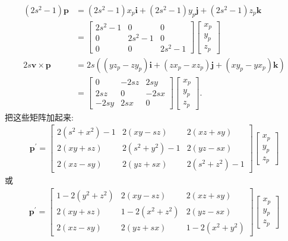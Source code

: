 $$
\begin{aligned}
\left(2 s^{2}-1\right) \mathbf{p} & =\left(2 s^{2}-1\right) x_{p} \mathbf{i}+\left(2 s^{2}-1\right) y_{p} \mathbf{j}+\left(2 s^{2}-1\right) z_{p} \mathbf{k} \\
& =\left[\begin{array}{ccc}
2 s^{2}-1 & 0 & 0 \\
0 & 2 s^{2}-1 & 0 \\
0 & 0 & 2 s^{2}-1
\end{array}\right]\left[\begin{array}{l}
x_{p} \\
y_{p} \\
z_{p}
\end{array}\right]\\
2 s \mathbf{v} \times \mathbf{p} & =2 s\left(\left(y z_{p}-z y_{p}\right) \mathbf{i}+\left(z x_{p}-x z_{p}\right) \mathbf{j}+\left(x y_{p}-y x_{p}\right) \mathbf{k}\right) \\
& =\left[\begin{array}{ccc}
0 & -2 s z & 2 s y \\
2 s z & 0 & -2 s x \\
-2 s y & 2 s x & 0
\end{array}\right]\left[\begin{array}{l}
x_{p} \\
y_{p} \\
z_{p}
\end{array}\right] .
\end{aligned}
$$
把这些矩阵加起来:
\begin{align}
\mathbf{p}^{\prime}=\left[\begin{array}{ccc}
2\left(s^{2}+x^{2}\right)-1 & 2(x y-s z) & 2(x z+s y) \\
2(x y+s z) & 2\left(s^{2}+y^{2}\right)-1 & 2(y z-s x) \\
2(x z-s y) & 2(y z+s x) & 2\left(s^{2}+z^{2}\right)-1
\end{array}\right]\left[\begin{array}{l}
x_{p} \\
y_{p} \\
z_{p}
\end{array}\right]
\end{align}
或
\begin{align}
\mathbf{p}^{\prime}=\left[\begin{array}{ccc}
1-2\left(y^{2}+z^{2}\right) & 2(x y-s z) & 2(x z+s y) \\
2(x y+s z) & 1-2\left(x^{2}+z^{2}\right) & 2(y z-s x) \\
2(x z-s y) & 2(y z+s x) & 1-2\left(x^{2}+y^{2}\right)
\end{array}\right]\left[\begin{array}{l}
x_{p} \\
y_{p} \\
z_{p}
\end{array}\right]
\end{align}
